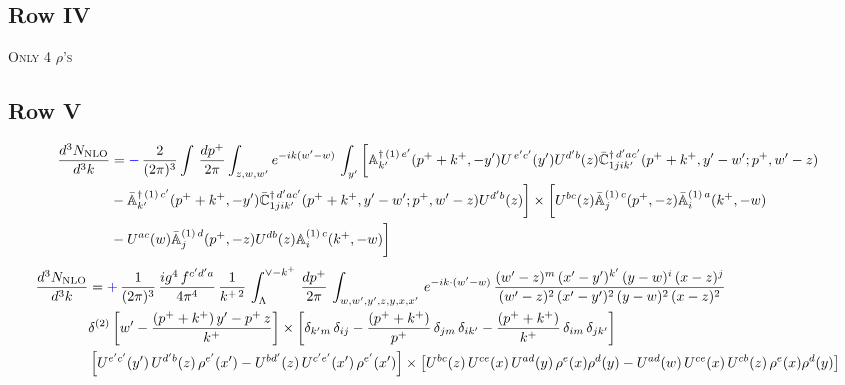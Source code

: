 \documentclass[9pt]{article}
\def\mf#1{\mathbb{#1}}
\numberwithin{equation}{section}
\begin{document}
\subsection{Row IV\,}
\textsc{Only 4 $\rho$'s}
\subsection{Row V\,}
\begin{align}
 \frac{d^{3}N_{\rm NLO}}{d^{3}k} & = {\color{blue}-}\,\frac{2}{(2\pi)^{3}} \int\, \frac{dp^{+}}{2\pi}\int_{z,w,w^{\prime}} e^{-ik(w^{\prime}-w)}\,\int_{y^{\prime}}\bigg[\mf{A}^{\dagger\, (1)\,e^{\prime}}_{k^{\prime}}(p^{+}+k^{+},-y^{\prime})U^{\, e^{\prime}c^{\prime}}(y^{\prime})U^{d^{\prime}b}(z) \Bar{\mf{C}}^{\dagger\, d^{\prime}ac^{\prime}}_{1jik^{\prime}}(p^{+}+k^{+},y^{\prime}-w^{\prime}; p^{+},w^{\prime}-z) \notag \\ & -\Bar{\mf{A}}^{\dagger\, (1)\,c^{\prime}}_{k^{\prime}}(p^{+}+k^{+},-y^{\prime}) \Bar{\mf{C}}^{\dagger\, d^{\prime}ac^{\prime}}_{1jik^{\prime}}(p^{+}+k^{+},y^{\prime}-w^{\prime}; p^{+},w^{\prime}-z)U^{d^{\prime}b}(z)\bigg] \times  \bigg[U^{bc}(z)\Bar{\mf{A}}^{(1)\, c}_{j}(p^{+},-z)\Bar{\mf{A}}^{(1)\, a}_{i}(k^{+},-w)\notag \\ & -U^{ac}(w) \Bar{\mf{A}}^{(1)\, d}_{j}(p^{+},-z)U^{db}(z) \mf{A}^{(1)\, c}_{i}(k^{+},- w)\bigg]\nonumber
\end{align}
\begin{align}
     \frac{d^{3}N_{\rm NLO}}{d^{3}k} & = {\color{blue}+}\, \frac{1}{(2\pi)^{3}}\,\frac{ig^{4}\,f^{c'd'a}}{4\pi^{4}}\, \frac{1}{k^{+\,2}}\,\int_{\Lambda}^{\vee-k^{+}}\, \frac{dp^{+}}{2\pi}\, \int_{w,w',y',z,y,x,x'}\, e^{-ik\cdot (w'-w)}\, \frac{(w'-z)^{m}\,(x'-y')^{k'}\,(y-w)^{i}\,(x-z)^{j}}{(w'-z)^{2}\,(x'-y')^{2}\,(y-w)^{2}\,(x-z)^{2}}\notag \\ & \delta^{(2)}\left[w'-\frac{(p^{+}+k^{+})\,y'-p^{+}\,z}{k^{+}}\right]\times \left[\delta_{k'm}\,\delta_{ij}-\frac{(p^{+}+k^{+})}{p^{+}}\,\delta_{jm}\,\delta_{ik'}-\frac{(p^{+}+k^{+})}{k^{+}}\, \delta_{im}\, \delta_{jk'}\right]\notag \\ & \left[U^{e'c'}(y')\,U^{d'b}(z)\,\rho^{e'}(x')-U^{bd'}(z)\,U^{c'e'}(x')\,\rho^{e'}(x')\right]\times \left[U^{bc}(z)\,U^{ce}(x)\,U^{ad}(y)\,\rho^{e}(x)\rho^{d}(y)-U^{ad}(w)\,U^{ce}(x)\,U^{cb}(z)\,\rho^{e}(x)\rho^{d}(y)\right]
\end{align}
\end{document}
